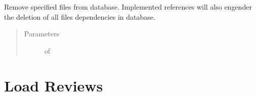 \documentclass[letterpaper,10pt,english]{sphinxmanual}
\begin{document}
\begin{fulllineitems}
\begin{quote}
\begin{description}
%
\begin{sphinxVerbatim}[commandchars=\\\{\}]
   
  
\end{sphinxVerbatim}

\end{description}\end{quote}

\end{fulllineitems}


\begin{fulllineitems}
\label{\detokenize{load:loacore.load.file_load.remove_files}}
Remove specified files from database. Implemented references will also engender the deletion of all files
dependencies in database.
\begin{quote}\begin{description}
\item[{Parameters}] \leavevmode
{} \textendash{}  of {\hyperref[\detokenize{classes:loacore.classes.classes.File}]{}}

\end{description}\end{quote}

\end{fulllineitems}



\section{Load Reviews}
\label{\detokenize{load:module-loacore.load.review_load}}\label{\detokenize{load:load-reviews}}
\end{document}
